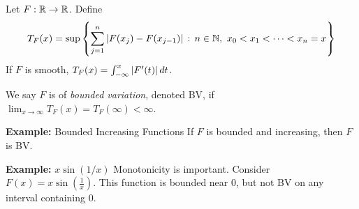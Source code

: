 Let $F : \mathbb{R} \to \mathbb{R}$. Define
\[ T_F(x) = \sup\left\{\sum_{j = 1}^{n} \left\lvert {F(x_j) - F(x_{j - 1})} \right\rvert \, :\, n \in \mathbb{N},\ x_0 < x_1 < \cdots < x_n = x\right\} \]
If $F$ is smooth, $T_F(x) = \int_{-\infty}^{x} \left\lvert {F'(t)} \right\rvert dt$.

\begin{definition}
    We say $F$ is of \emph{bounded variation}, denoted BV, if $\lim_{x \to \infty} T_F(x) = T_F(\infty) < \infty$.
\end{definition}

\begin{example}{\textbf{Example:} Bounded Increasing Functions}
    If $F$ is bounded and increasing, then $F$ is BV.
\end{example}

\begin{example}{\textbf{Example:} $x\sin(1/x)$}
    Monotonicity is important. Consider $F(x) = x\sin\left(\frac{1}{x}\right)$.
    This function is bounded near 0, but not BV on any interval containing 0. 
\end{example}

